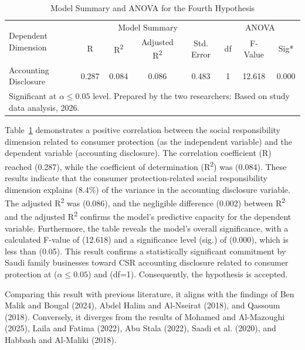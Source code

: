 \documentclass{NSP1}
\begin{document}
\begin{table}[!ht]
\centering
\caption{Model Summary and ANOVA for the Fourth Hypothesis}
\label{tab:h4}
\begin{tabular}{lccccccc}
\hline
\multirow{2}{*}{Dependent Dimension} & \multicolumn{4}{c}{Model Summary} & \multicolumn{3}{c}{ANOVA} \\
 & R & R\textsuperscript{2} & Adjusted R\textsuperscript{2} & Std. Error & df & F-Value & Sig* \\
\hline
Accounting Disclosure & 0.287 & 0.084 & 0.086 & 0.483 & 1 & 12.618 & 0.000 \\
\hline
\multicolumn{8}{l}{\footnotesize *Significant at $\alpha \le 0.05$ level. Prepared by the two researchers: Based on study data analysis, 2026.} \\
\end{tabular}
\end{table}

Table~\ref{tab:h4} demonstrates a positive correlation between the social responsibility dimension related to consumer protection (as the independent variable) and the dependent variable (accounting disclosure). The correlation coefficient (R) reached (0.287), while the coefficient of determination (R\textsuperscript{2}) was (0.084). These results indicate that the consumer protection-related social responsibility dimension explains (8.4\%) of the variance in the accounting disclosure variable. The adjusted R\textsuperscript{2} was (0.086), and the negligible difference (0.002) between R\textsuperscript{2} and the adjusted R\textsuperscript{2} confirms the model's predictive capacity for the dependent variable. Furthermore, the table reveals the model's overall significance, with a calculated F-value of (12.618) and a significance level (sig.) of (0.000), which is less than (0.05). This result confirms a statistically significant commitment by Saudi family businesses toward CSR accounting disclosure related to consumer protection at ($\alpha \le 0.05$) and (df=1). Consequently, the hypothesis is accepted.

Comparing this result with previous literature, it aligns with the findings of Ben Malik and Bougal (2024), Abdel Halim and Al-Nseirat (2018), and Qassoum (2018). Conversely, it diverges from the results of Mohamed and Al-Mazoughi (2025), Laila and Fatima (2022), Abu Stala (2022), Saadi et al. (2020), and Habbash and Al-Maliki (2018).
\end{document}
